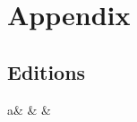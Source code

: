 \documentclass{memoir}
\begin{document}
\chapter{Appendix}	
\section{Editions}
\beginnumbering
\stanza
{}a&
&
\&
\end{document}
